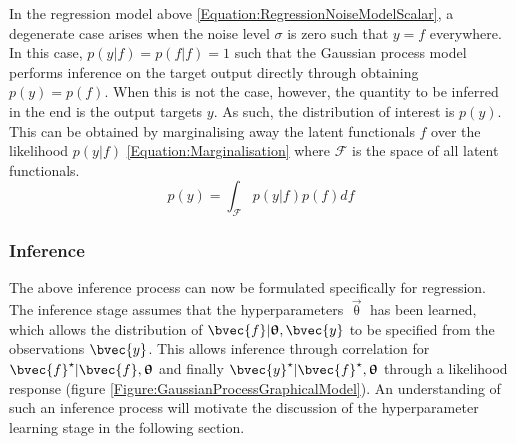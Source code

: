 				In the regression model above \eqref{Equation:RegressionNoiseModelScalar}, a degenerate case arises when the noise level $\sigma$ is zero such that $y = f$ everywhere. In this case, $p(y | f) = p(f | f) = 1$ such that the Gaussian process model performs inference on the target output directly through obtaining $p (y) = p(f)$. When this is not the case, however, the quantity to be inferred in the end is the output targets $y$. As such, the distribution of interest is $p(y)$. This can be obtained by marginalising away the latent functionals $f$ over the likelihood $p(y | f)$ \eqref{Equation:Marginalisation} where $\mathscr{F}$ is the space of all latent functionals. \begin{equation}
					p(y) = \int_{\mathscr{F}} p(y | f) p(f) df
				\label{Equation:Marginalisation}
				\end{equation}
				
		
			\subsubsection{Inference}
			\label{Background:GaussianProcesses:Regression:Inference}
			
				The above inference process can now be formulated specifically for regression. The inference stage assumes that the hyperparameters $\vec{\uptheta}$ has been learned, which allows the distribution of $\bvec{f} | \vec{\uptheta}, \bvec{y}$ to be specified from the observations $\bvec{y}$. This allows inference through correlation for $\bvec{f}^{\star} | \bvec{f}, \vec{\uptheta}$ and finally $\bvec{y}^{\star} | \bvec{f}^{\star}, \vec{\uptheta}$ through a likelihood response (figure \ref{Figure:GaussianProcessGraphicalModel}). An understanding of such an inference process will motivate the discussion of the hyperparameter learning stage in the following section.
				
